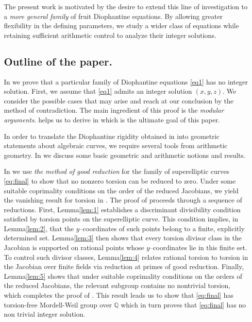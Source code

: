 \documentclass[12pt, reqno]{amsart}
\numberwithin{equation}{section}
\theoremstyle{definition}
\theoremstyle{nodefstyle}
\begin{document}
The present work is motivated by the desire to extend this line of investigation to a
\emph{more general family} of fruit Diophantine equations. By allowing greater flexibility
in the defining parameters, we study a wider class of equations while retaining sufficient
arithmetic control to analyze their integer solutions.
\subsection{Outline of the paper.}In  we prove that a particular family of Diophantine equations \eqref{eq1} has no integer solution. First, we assume that \eqref{eq1} admits an integer solution $(x,y,z)$. We consider the possible cases that may arise and reach at our conclusion by the method of contradiction. The main ingredient of this proof is the \emph{modular arguments}.  helps us to derive  in  which is the ultimate goal of this paper.

In order to translate the Diophantine rigidity obtained in  into geometric
statements about algebraic curves, we require several tools from arithmetic geometry. In  we discuss some basic geometric and arithmetic notions and results.

In  we use \emph{the method of good reduction} for the family of superelliptic curves \eqref{eq:final} to show that no nonzero torsion can be reduced to zero. Under some suitable coprimality conditions on the order of the reduced Jacobians, we yield the vanishing result for torsion in . The proof of  proceeds through a sequence of reductions.
First, Lemma\autoref{lem:1} establishes a discriminant divisibility condition satisfied by torsion points on the superelliptic curve.
This condition implies, in Lemma\autoref{lem:2}, that the $y$--coordinates of such points belong to a finite, explicitly determined set.
Lemma\autoref{lem:3} then shows that every torsion divisor class in the Jacobian is supported on rational points whose $y$--coordinates lie in this finite set.
To control such divisor classes, Lemma\autoref{lem:4} relates rational torsion to torsion in the Jacobian over finite fields via reduction at primes of good reduction.
Finally, Lemma\autoref{lem:5} shows that under suitable coprimality conditions on the orders of the reduced Jacobians, the relevant subgroup contains no nontrivial torsion, which completes the proof of . This result leads us to show that \eqref{eq:final} has torsion-free Mordell-Weil group over $\mathbb Q$ which in turn proves that \eqref{eq:final} has no non trivial integer solution.
\end{document}
